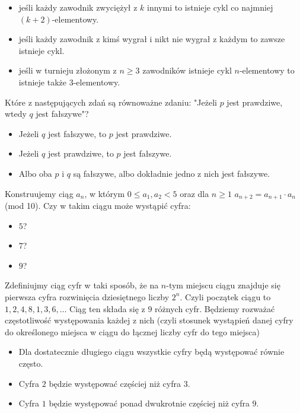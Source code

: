 \documentclass[12pt, a4paper]{article}
\newcommand{\question}[1]{\normalitem \begin{samepage}#1 \end{samepage}}
\begin{document}
\begin{enumerate}
{			\begin{itemize}
			\item jeśli każdy zawodnik zwyciężył z $k$ innymi to istnieje cykl co najmniej $(k+2)$-elementowy.
			\item jeśli każdy zawodnik z kimś wygrał i nikt nie wygrał z każdym to zawsze istnieje cykl.
			\item jeśli w turnieju złożonym z $n \geq 3$ zawodników istnieje cykl $n$-elementowy to istnieje także $3$-elementowy.
		\end{itemize}
	}
	
	\question {
		Które z następujących zdań są równoważne zdaniu: "Jeżeli $p$ jest prawdziwe, wtedy $q$ jest fałszywe"?
	
		\begin{itemize}
			\item Jeżeli $q$ jest fałszywe, to $p$ jest prawdziwe. 
			\item Jeżeli $q$ jest prawdziwe, to $p$ jest fałszywe.
			\item Albo oba $p$ i $q$ są fałszywe, albo dokładnie jedno z nich jest fałszywe. 
		\end{itemize}
	}
	
	\question {
		Konstruujemy ciąg $a_n$, w którym $0 \leq a_1,a_2 < 5$ oraz dla $n \geq 1$ $a_{n+2}=a_{n+1} \cdot a_n $ (mod 10). Czy w takim ciągu może wystąpić cyfra:
	
		\begin{itemize}
			\item $5$?
			\item $7$?
			\item $9$?
		\end{itemize}
	}
	
	\question {
		Zdefiniujmy ciąg cyfr w taki sposób, że na $n$-tym miejscu ciągu znajduje się pierwsza cyfra rozwinięcia dziesiętnego liczby $2^n$. Czyli początek ciągu to $1, 2, 4, 8, 1, 3, 6, \ldots$ Ciąg ten składa się z $9$ różnych cyfr. Będziemy rozważać częstotliwość występowania każdej z nich (czyli stosunek wystąpień danej cyfry do określonego miejsca w ciągu do łącznej liczby cyfr do tego miejsca)
	
		\begin{itemize}
			\item Dla dostatecznie długiego ciągu wszystkie cyfry będą występować równie często.
			\item Cyfra $2$ będzie występować częściej niż cyfra $3$.
			\item Cyfra $1$ będzie występować ponad dwukrotnie częściej niż cyfra $9$.
		\end{itemize}
	}
	

\end{enumerate}
\end{document}
